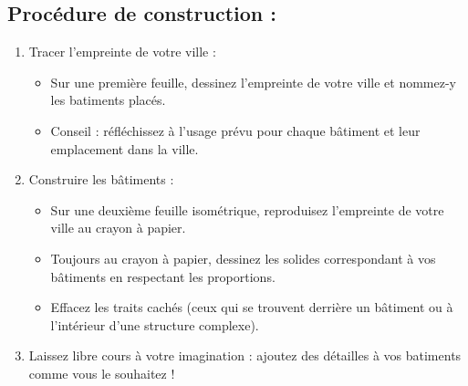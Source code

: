\subsection*{Procédure de construction :}
\begin{enumerate}
    \item Tracer l'empreinte de votre ville :
    \begin{itemize}
        \item Sur une première feuille, dessinez l'empreinte de votre ville et nommez-y les batiments placés.
        \item Conseil : réfléchissez à l'usage prévu pour chaque bâtiment et leur emplacement dans la ville.
    \end{itemize}
    \item Construire les bâtiments :
    \begin{itemize}
        \item Sur une deuxième feuille isométrique, reproduisez l'empreinte de votre ville au crayon à papier.
        \item Toujours au crayon à papier, dessinez les solides correspondant à vos bâtiments en respectant les proportions.
        \item Effacez les traits cachés (ceux qui se trouvent derrière un bâtiment ou à l'intérieur d'une structure complexe).
    \end{itemize}
    \item Laissez libre cours à votre imagination : ajoutez des détailles à vos batiments comme vous le souhaitez !
\end{enumerate}
